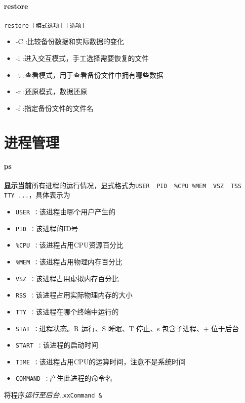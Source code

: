 \documentclass[UTF8,a4paper,12pt]{ctexbook}
\begin{document}
			\paragraph{restore}\verb|restore [模式选项] [选项]|
				\begin{itemize}
					\item -C :比较备份数据和实际数据的变化 
					\item -i :进入交互模式，手工选择需要恢复的文件
					\item -t :查看模式，用于查看备份文件中拥有哪些数据
					\item -r :还原模式，数据还原
					\item -f :指定备份文件的文件名
				\end{itemize}
	\section{进程管理}
		\paragraph{ps}\textbf{显示当前}所有进程的运行情况，显式格式为\verb|USER  PID  %CPU %MEM  VSZ  TSS TTY ...|，具体表示为
			\begin{itemize}
				\item \verb|USER ：|该进程由哪个用户产生的
				\item \verb|PID ：|该进程的ID号
				\item \verb|%CPU ：|该进程占用CPU资源百分比
				\item \verb|%MEM ：|该进程占用物理内存百分比
				\item \verb|VSZ ：|该进程占用虚拟内存百分比
				\item \verb|RSS ：|该进程占用实际物理内存的大小
				\item \verb|TTY ：|该进程在哪个终端中运行的
				\item \verb|STAT ：|进程状态。R 运行、S 睡眠、T 停止、s 包含子进程、+ 位于后台
				\item \verb|START ：|该进程的启动时间
				\item \verb|TIME ：|该进程占用CPU的运算时间，注意不是系统时间
				\item \verb|COMMAND ：|产生此进程的命令名
			\end{itemize}
			
			将程序\textit{运行至后台}..\verb|xxCommand &|
			
\end{document}

